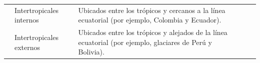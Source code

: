 \begin{table}[H]
\begin{tabularx}{\linewidth}{@{} *5{X} @{}}
                                                              & Intertropicales internos  & Ubicados entre los trópicos y cercanos a la línea ecuatorial (por ejemplo, Colombia y Ecuador).                                                                                                                                                                                                           \\ \cline{2-3}
                                                              & Intertropicales externos  & Ubicados entre los trópicos y alejados de la línea ecuatorial (por ejemplo, glaciares de Perú y Bolivia).                                                                                                                                                                                                 \\ \hline
    \end{tabularx}
    \begin{minipage}{\textwidth}
        \vspace{10pt}
        \label{tab:ClasificacionGlaciaresII}
    \end{minipage}
\end{table}